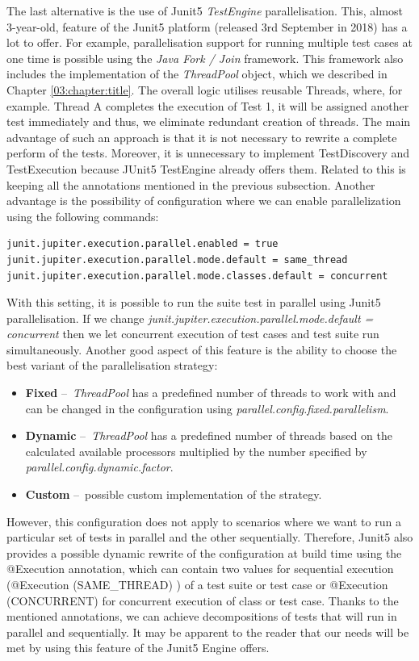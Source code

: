 The last alternative is the use of Junit5 \emph{TestEngine} parallelisation.
This, almost 3-year-old, feature of the Junit5 platform (released 3rd September in 2018) has a lot to offer.
For example, parallelisation support for running multiple test cases at one time is possible using the \emph{Java Fork / Join} framework.
This framework also includes the implementation of the \emph{ThreadPool} object, which we described in Chapter \ref{03:chapter:title}.
The overall logic utilises reusable Threads, where, for example.
Thread A completes the execution of Test 1, it will be assigned another test immediately and thus, we eliminate redundant creation of threads.
The main advantage of such an approach is that it is not necessary to rewrite a complete perform of the tests.
Moreover, it is unnecessary to implement TestDiscovery and TestExecution because JUnit5 TestEngine already offers them.
Related to this is keeping all the annotations mentioned in the previous subsection.
Another advantage is the possibility of configuration where we can enable parallelization using the following commands:
\begin{verbatim}
junit.jupiter.execution.parallel.enabled = true
junit.jupiter.execution.parallel.mode.default = same_thread
junit.jupiter.execution.parallel.mode.classes.default = concurrent
\end{verbatim}
With this setting, it is possible to run the suite test in parallel using Junit5 parallelisation.
If we change \emph{junit.jupiter.execution.parallel.mode.default = concurrent} then we let concurrent execution of test cases and test suite run simultaneously.
Another good aspect of this feature is the ability to choose the best variant of the parallelisation strategy:
\begin{itemize}[itemsep=1mm, parsep=0pt]
    \item \textbf{Fixed} \---\ \emph{ThreadPool} has a predefined number of threads to work with and can be changed in the configuration using \emph{parallel.config.fixed.parallelism}.
    \item \textbf{Dynamic} \---\ \emph{ThreadPool} has a predefined number of threads based on the calculated available processors multiplied by the number specified by \emph{parallel.config.dynamic.factor}.
    \item \textbf{Custom} \---\ possible custom implementation of the strategy.
\end{itemize}
However, this configuration does not apply to scenarios where we want to run a particular set of tests in parallel and the other sequentially.
Therefore, Junit5 also provides a possible dynamic rewrite of the configuration at build time using the @Execution annotation, which can contain two values for sequential execution (@Execution (SAME\_THREAD) ) of a test suite or test case or @Execution (CONCURRENT) for concurrent execution of class or test case.
Thanks to the mentioned annotations, we can achieve decompositions of tests that will run in parallel and sequentially.
It may be apparent to the reader that our needs will be met by using this feature of the Junit5 Engine offers.

